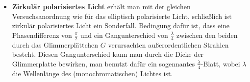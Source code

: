 \documentclass[a4paper,titlepage]{scrartcl}
\numberwithin{equation}{section}
\begin{document}
\begin{itemize}
Infolge des Gangunterschiedes setzen sich die beiden senkrecht zueinander schwingenden Lichtbündel zu einem elliptisch polarisieren Lichtbündel zusammen\footnote{Die Zusammensetzung zweier zueinander senkrecht stehenden Sinusschwingungen mit gleicher Frequenz ergibt elliptische Bahnen.}.\\ \\
Zum Nachweis der Polarisationsart ist der Analysator $A$ eingebaut worden, das von ihm durchgelassene Licht fällt auf eine Linse $L$, die auf dem Strahlungsmesser $M$ abbildet. Es soll dann die Abhängigkeit der Intensität für verschiedene Winkel $\psi$ zwischen den Schwingungsebenen des Analysators und Polarisators untersucht werden.
\item \textbf{Zirkulär polarisiertes Licht} erhält man mit der gleichen Versuchsanordnung wie für das elliptisch polarisierte Licht, schließlich ist zirkulär polarisiertes Licht ein Sonderfall. Bedingung dafür ist, dass eine Phasendifferenz von $\frac{\pi}{2}$ und ein Gangunterschied von $\frac{\lambda}{4}$ zwischen den beiden durch das Glimmerplättchen $G$ verursachten außerordentlichen Strahlen besteht. Diesen Gangunterschied kann man durch die Dicke der Glimmerplatte bewirken, man benutzt dafür ein sogennantes $\frac{\lambda}{4}$-Blatt, wobei $\lambda$ die Wellenlänge des (monochromatischen) Lichtes ist.
\end{itemize}
\end{document}
